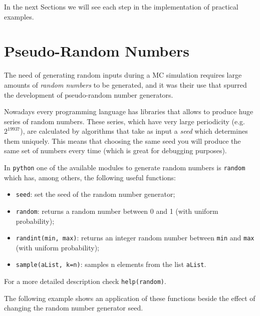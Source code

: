 In the next Sections we will see each step in the implementation of practical examples.

\section{Pseudo-Random Numbers}
\label{pseudo-random-numbers}

The need of generating random inputs during a MC simulation requires large amounts of \emph{random numbers} to be generated, and it was their use that spurred the development of pseudo-random number generators. 

Nowadays every programming language has libraries that allows to produce huge series of random numbers. These series, which have very large periodicity (e.g. \(2^{19937}\)), are calculated by algorithms that take as input a \emph{seed} which determines them uniquely. This means that choosing the same seed you will produce the same set of numbers every time (which is great for debugging purposes).

In \texttt{python} one of the available modules to generate random numbers is \texttt{random} which has, among others, the following useful functions:
\begin{itemize}
\tightlist
\item
  \texttt{seed}: set the seed of the random number generator;
\item
  \texttt{random}: returns a random number between 0 and 1 (with uniform
  probability);
\item
  \texttt{randint(min,\ max)}: returns an integer random number between
  \texttt{min} and \texttt{max} (with uniform probability);
\item
  \texttt{sample(aList,\ k=n)}: samples n elements from the list
  \texttt{aList}.
\end{itemize}
\noindent
For a more detailed description check \texttt{help(random)}.

The following example shows an application of these functions beside the effect of  changing the random number generator seed.


